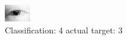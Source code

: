 \begin{figure}[h!]
\begin{center}
\includegraphics[width=0.60\columnwidth]{figures/ID159_class_4_target_3.png}
\end{center}
\caption{ Classification: 4 actual target: 3}
\label{fig:ID159_class_4_target_3}
\end{figure}
